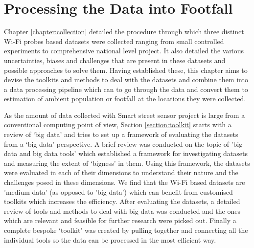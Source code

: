 \chapter{Processing the Data into Footfall} \label{chapter:processing}

Chapter \ref{chapter:collection} detailed the procedure through which three distinct Wi-Fi probes based datasets were collected ranging from small controlled experiments to comprehensive national level project.
It also detailed the various uncertainties, biases and challenges that are present in these datasets and possible approaches to solve them.
Having established these, this chapter aims to devise the toolkits and methods to deal with the datasets and combine them into a data processing pipeline which can to go through the data and convert them to estimation of ambient population or footfall at the locations they were collected.

As the amount of data collected with Smart street sensor project is large from a conventional computing point of view, Section \ref{section:toolkit} starts with a review of `big data' and tries to set up a framework of evaluating the datasets from a `big data' perspective.
A brief review was conducted on the topic of 'big data and big data tools' which established a framework for investigating datasets and measuring the extent of 
`bigness' in them.
Using this framework, the datasets were evaluated in each of their dimensions to understand their nature and the challenges posed in these dimensions.
We find that the Wi-Fi based datasets are 'medium data' (as opposed to 'big data') which can benefit from customised toolkits which increases the efficiency.
After evaluating the datasets, a detailed review of tools and methods to deal with big data was conducted and the ones which are relevant and feasible for further research were picked out.
Finally a complete bespoke `toolkit' was created by pulling together and connecting all the individual tools so the data can be processed in the most efficient way.

